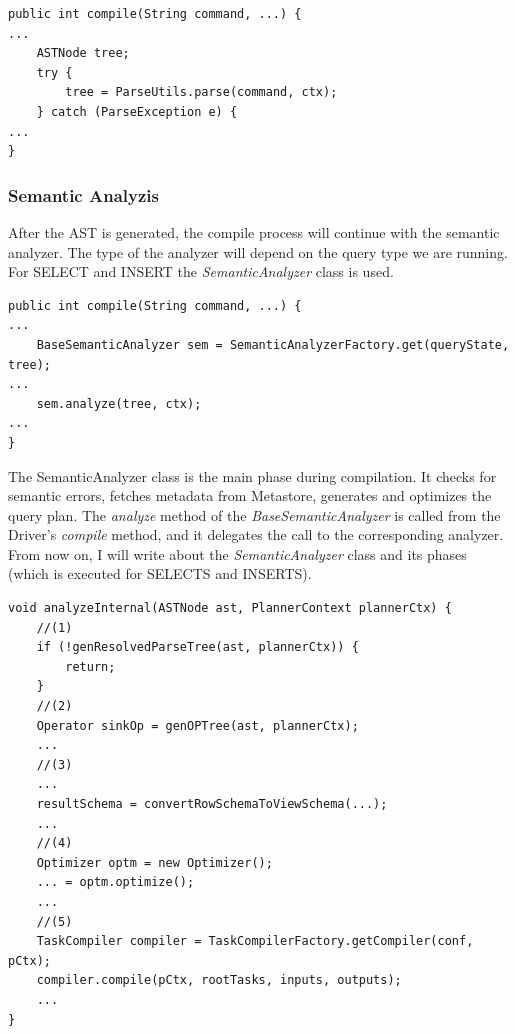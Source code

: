 \begin{lstlisting}
public int compile(String command, ...) {
...
	ASTNode tree;
	try {
		tree = ParseUtils.parse(command, ctx);
	} catch (ParseException e) {
...
}
\end{lstlisting}
\subsubsection{Semantic Analyzis}
After the AST is generated, the compile process will continue with the semantic analyzer. The type of the analyzer will depend on the query type we are running. For SELECT and INSERT the \textit{SemanticAnalyzer} class is used. 

\begin{lstlisting}
public int compile(String command, ...) {
...
	BaseSemanticAnalyzer sem = SemanticAnalyzerFactory.get(queryState, tree);
...
	sem.analyze(tree, ctx);
...
}
\end{lstlisting}

The SemanticAnalyzer class is the main phase during compilation. It checks for semantic errors, fetches metadata from Metastore, generates and optimizes the query plan. The \textit{analyze} method of the \textit{BaseSemanticAnalyzer} is called from the Driver's \textit{compile} method, and it delegates the call to the corresponding analyzer. From now on, I will write about the \textit{SemanticAnalyzer} class and its phases (which is executed for SELECTS and INSERTS).

\begin{lstlisting}
void analyzeInternal(ASTNode ast, PlannerContext plannerCtx) {
	//(1)
	if (!genResolvedParseTree(ast, plannerCtx)) {
		return;
	}
	//(2)
	Operator sinkOp = genOPTree(ast, plannerCtx);
	...
	//(3)
	...
	resultSchema = convertRowSchemaToViewSchema(...);
	...
	//(4)
	Optimizer optm = new Optimizer();
	... = optm.optimize();
	...
	//(5)
	TaskCompiler compiler = TaskCompilerFactory.getCompiler(conf, pCtx);
	compiler.compile(pCtx, rootTasks, inputs, outputs);
	...
}
\end{lstlisting}

